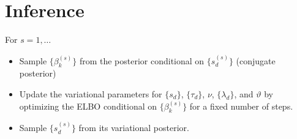 \documentclass[11pt, oneside]{article}   	%
\begin{document}
\section{Inference}

For $s=1,\dotsc$
\begin{itemize}
	\item Sample $\{\beta_k^{(s)} \}$ from the posterior conditional on $\{s_d^{(s)}\}$ (conjugate posterior)
	\item Update the variational parameters for $\{s_d\}$, $\{\tau_d\}$, $\nu$, $\{\lambda_d\}$, and $\vartheta$ by optimizing the ELBO conditional on $\{\beta_k^{(s)} \}$ for a fixed number of steps.
	\item Sample $\{s_d^{(s)}\}$ from its variational posterior.
\end{itemize}
\end{document}
